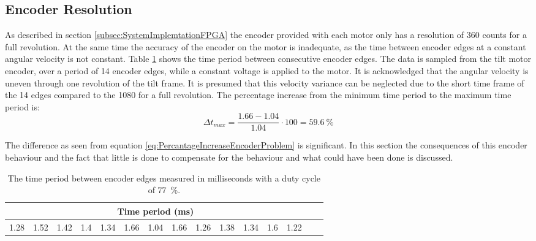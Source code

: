 \documentclass[../../main.tex]{subfiles}
\begin{document}



\subsection{Encoder Resolution}
As described in section \ref{subsec:SystemImplemtationFPGA} the encoder provided with each motor only has a resolution of 360 counts for a full revolution. At the same time the accuracy of the encoder on the motor is inadequate, as the time between encoder edges at a constant angular velocity is not constant. Table \ref{tab:EncoderDifferenceBetweenEdges} shows the time period between consecutive encoder edges. The data is sampled from the tilt motor encoder, over a period of 14 encoder edges, while a constant voltage is applied to the motor. It is acknowledged that the angular velocity is uneven through one revolution of the tilt frame. It is presumed that this velocity variance can be neglected due to the short time frame of the 14 edges compared to the 1080 for a full revolution. 
The percentage increase from the minimum time period to the maximum time period is:
\begin{equation} \label{eq:PercantageIncreaseEncoderProblem}
    \Delta t_{max} = \frac{1.66 - 1.04}{1.04} \cdot 100 = \SI{59.6}{\percent} 
\end{equation}

The difference as seen from equation \ref{eq:PercantageIncreaseEncoderProblem} is significant. In this section the consequences of this encoder behaviour and the fact that little is done to compensate for the behaviour and what could have been done is discussed.

\begin{table}[H]
    \centering
    \begin{tabular}{c c c c c c c c c c c c c c c}
         \multicolumn{13}{c}{Time period (ms)} \\ \hline
         
         1.28 &
         1.52 &
         1.42 &
         1.4  &
         1.34 &
         1.66 &
         1.04 &
         1.66 &
         1.26 &
         1.38 &
         1.34 &
         1.6  &
         1.22 
       
    \end{tabular}
    \caption{The time period between encoder edges measured in milliseconds with a duty cycle of \SI{77}{\percent}.}
    \label{tab:EncoderDifferenceBetweenEdges}
\end{table}
\end{document}
